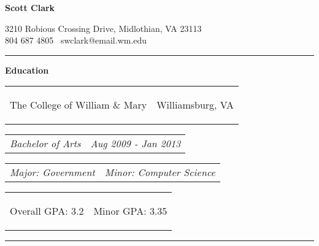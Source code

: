 \documentclass[11pt]{article}
\makeatletter
\newcommand{\headerrow}[2]
{\begin{tabular*}{\linewidth}{l@{\extracolsep{\fill}}r}
	#1 &
	#2 \\
\end{tabular*}}
\makeatother
\begin{document}
\begin{center}
	\begin{huge}
		\bf Scott Clark
	\end{huge}
	
	\large 3210 Robious Crossing Drive, Midlothian, VA 23113 \\
	\large 804 687 4805 \textbullet\  swclark@email.wm.edu
\end{center}


\hrule
\vspace{0.5em}

\begin{LARGE}
	\bf Education
\end{LARGE}

\vspace{0.5em}

\headerrow
	{\begin{Large}The College of William \& Mary\end{Large}}
	{Williamsburg, VA}
\headerrow
	{\textit{Bachelor of Arts}}
	{\textit{Aug 2009 - Jan 2013}}
\headerrow
	{\textit{Major: Government}}
	{\textit{Minor: Computer Science}}

\vspace{-0.9em}

\begin{center}
	\begin{tabular}{lr}
		\begin{large} Overall GPA: 3.2 \end{large} & \begin{large}Minor GPA: 3.35 \end{large} \\
	\end{tabular}
\end{center}


\vspace{-0.5em}
\hrule
\vspace{0.5em}
\end{document}
